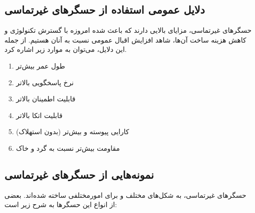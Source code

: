 \documentclass[conference]{IEEEtran-ModifiedForMVIP}
\begin{document}
\subsection{دلایل عمومی استفاده از حسگر‌های غیرتماسی}
حسگر‌های غیرتماسی، مزایای بالایی دارند که باعث شده امروزه با گسترش تکنولوژی و کاهش هزینه ساخت آن‌ها، شاهد افزایش اقبال عمومی نسبت به آنان هستیم. از جمله این دلایل، می‌توان به موارد زیر اشاره کرد. \cite{varriohm_2020}

\begin{enumerate}
	\item طول عمر بیش‌تر
	\item نرخ پاسخگویی بالاتر
	\item قابلیت اطمینان
	 بالاتر
	\item قابلیت اتکا بالاتر
	\item کارایی پیوسته و بیش‌تر (بدون استهلاک)
	\item مقاومت بیش‌تر نسبت به گرد‌ و خاک

	
\end{enumerate}


\subsection{نمونه‌هایی از حسگرهای غیرتماسی}

حسگرهای غیرتماسی، به شکل‌های مختلف و برای امورمختلفی ساخته شده‌اند. بعضی از انواع این حسگرها به شرح زیر است:
\end{document}
